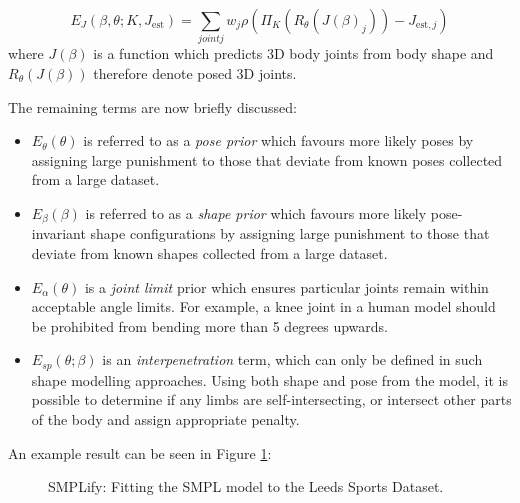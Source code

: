 \begin{equation}
    E_{J}(\beta, \theta; K, J_{\text{est}}) = \sum_{joint j} w_{j} \rho(\Pi_{K}(R_{\theta}(J(\beta)_j)) - J_{\text{est}, j})
\end{equation}
where $J(\beta)$ is a function which predicts 3D body joints from body shape and $R_{\theta}(J(\beta))$ therefore denote posed 3D joints.

The remaining terms are now briefly discussed:
\clearpage
\begin{itemize}
    \item $E_{\theta}(\theta)$ is referred to as a \textit{pose prior} which favours more likely poses by assigning large punishment to those that deviate from known poses collected from a large dataset.
    \item $E_{\beta}(\beta)$ is referred to as a \textit{shape prior} which favours more likely pose-invariant shape configurations by assigning large punishment to those that deviate from known shapes collected from a large dataset. 
    \item $E_{\alpha}(\theta)$ is a \textit{joint limit} prior which ensures particular joints remain within acceptable angle limits. For example, a knee joint in a human model should be prohibited from bending more than 5 degrees upwards.
    \item $E_{sp}(\theta; \beta)$ is an \textit{interpenetration} term, which can only be defined in such shape modelling approaches. Using both shape and pose from the model, it is possible to determine if any limbs are self-intersecting, or intersect other parts of the body and assign appropriate penalty.
\end{itemize}

An example result can be seen in Figure \ref{fig:smplify}:

\begin{figure}[H] %
    \caption{SMPLify: Fitting the SMPL model to the Leeds Sports Dataset.}
    \label{fig:smplify}
\end{figure}
        
